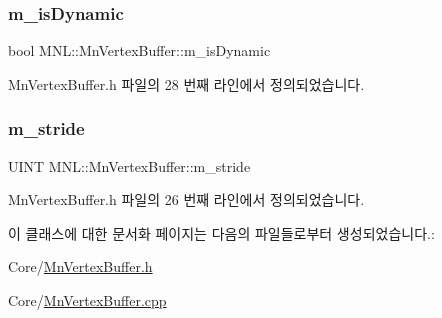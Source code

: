 \subsubsection{\texorpdfstring{m\+\_\+is\+Dynamic}{m\_isDynamic}}
{\footnotesize\ttfamily bool M\+N\+L\+::\+Mn\+Vertex\+Buffer\+::m\+\_\+is\+Dynamic\hspace{0.3cm}{\ttfamily [private]}}



Mn\+Vertex\+Buffer.\+h 파일의 28 번째 라인에서 정의되었습니다.

\mbox{\label{class_m_n_l_1_1_mn_vertex_buffer_a9b09d0ea70aef7003a065572fdb3d8f8}} 
\subsubsection{\texorpdfstring{m\+\_\+stride}{m\_stride}}
{\footnotesize\ttfamily U\+I\+NT M\+N\+L\+::\+Mn\+Vertex\+Buffer\+::m\+\_\+stride\hspace{0.3cm}{\ttfamily [private]}}



Mn\+Vertex\+Buffer.\+h 파일의 26 번째 라인에서 정의되었습니다.



이 클래스에 대한 문서화 페이지는 다음의 파일들로부터 생성되었습니다.\+:\begin{DoxyCompactItemize}
\item 
Core/\hyperlink{_mn_vertex_buffer_8h}{Mn\+Vertex\+Buffer.\+h}\item 
Core/\hyperlink{_mn_vertex_buffer_8cpp}{Mn\+Vertex\+Buffer.\+cpp}\end{DoxyCompactItemize}
